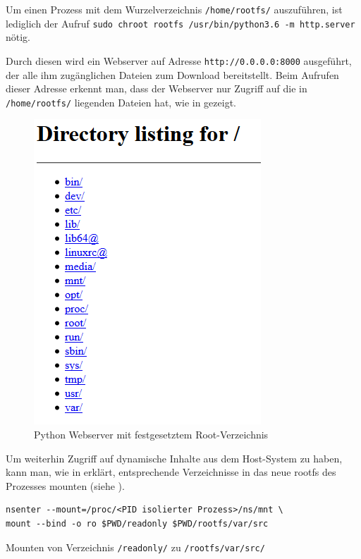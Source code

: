 Um einen Prozess mit dem Wurzelverzeichnis \texttt{/home/rootfs/} auszuführen, ist lediglich der Aufruf \texttt{sudo chroot rootfs /usr/bin/python3.6 -m http.server} nötig.

Durch diesen wird ein Webserver auf Adresse \texttt{http://0.0.0.0:8000} ausgeführt, der alle ihm zugänglichen Dateien zum Download bereitstellt. Beim Aufrufen dieser Adresse erkennt man, dass der Webserver nur Zugriff auf die in \texttt{/home/rootfs/} liegenden Dateien hat, wie in  gezeigt.

\begin{figure}[H]
	\begin{center}
		\includegraphics[scale=0.7]{bilder/chroot-python-webserver.png}
		\caption{Python Webserver mit festgesetztem Root-Verzeichnis}
		\label{fig:chrootPythonWebserver}
	\end{center}
\end{figure}

Um weiterhin Zugriff auf dynamische Inhalte aus dem Host-System zu haben, kann man, wie in  erklärt, entsprechende Verzeichnisse in das neue rootfs des Prozesses mounten (siehe ).

\begin{listing}[h]
	\begin{verbatim}
nsenter --mount=/proc/<PID isolierter Prozess>/ns/mnt \
mount --bind -o ro $PWD/readonly $PWD/rootfs/var/src
	\end{verbatim}
	\caption{Mounten von Verzeichnis \texttt{/readonly/} zu \texttt{/rootfs/var/src/}}
	\label{lst:mountReadOnly}
\end{listing}


